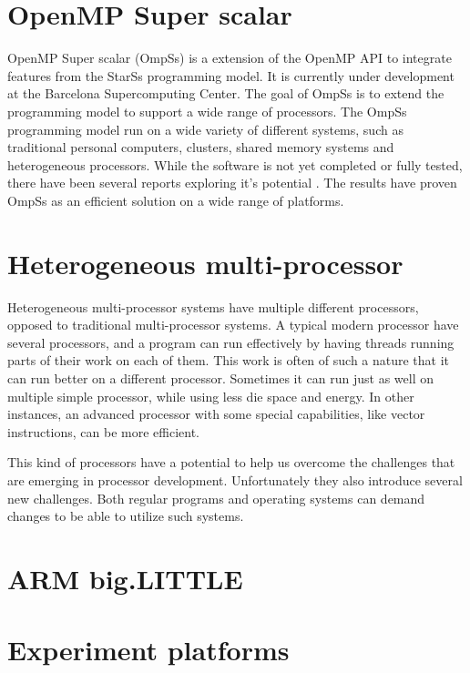\section[OmpSs]{OpenMP Super scalar}
OpenMP Super scalar (OmpSs) is a extension of the OpenMP API to integrate features from the StarSs programming model.
It is currently under development at the Barcelona Supercomputing Center.
The goal of OmpSs is to extend the programming model to support a wide range of processors.
The OmpSs programming model run on a wide variety of different systems, such as traditional personal computers, clusters, shared memory systems and heterogeneous processors.
While the software is not yet completed or fully tested, there have been several reports exploring it's potential \cite{lillesand13}\cite{natvig12}.
The results have proven OmpSs as an efficient solution on a wide range of platforms.


\section{Heterogeneous multi-processor}
Heterogeneous multi-processor systems have multiple different processors, opposed to traditional multi-processor systems.
A typical modern processor have several processors, and a program can run effectively by having threads running parts of their work on each of them.
This work is often of such a nature that it can run better on a different processor.
Sometimes it can run just as well on multiple simple processor, while using less die space and energy.
In other instances, an advanced processor with some special capabilities, like vector instructions, can be more efficient.

This kind of processors have a potential to help us overcome the challenges that are emerging in processor development.
Unfortunately they also introduce several new challenges.
Both regular programs and operating systems can demand changes to be able to utilize such systems.

\section{ARM big.LITTLE} \label{bigLITTLE}

\section{Experiment platforms}

